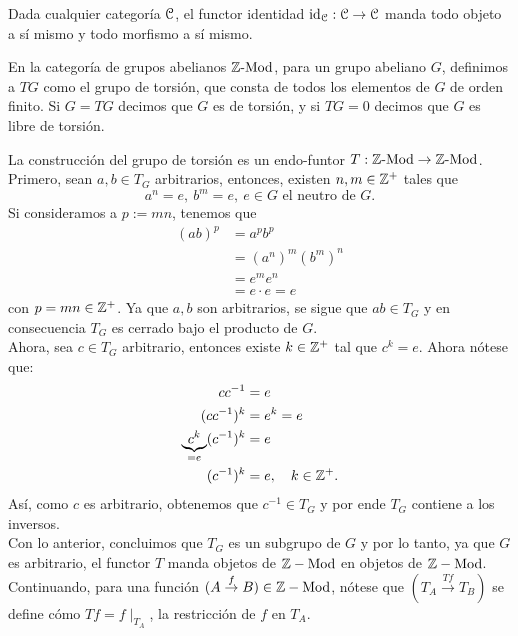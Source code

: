     \begin{example}
    \item Dada cualquier categoría $\cal C$, el functor identidad
        $\id_{\cal C}:\cal C\to\cal C$ manda todo objeto a sí mismo y todo
        morfismo a sí mismo.
    \item En la categoría de grupos abelianos $\Z\ds\Mod$, para
    un grupo abeliano $G$,     definimos a $TG$ como el grupo de
    torsión, que consta de todos los elementos de $G$ de orden
    finito. Si $G=TG$ decimos que $G$ es de torsión, y si $TG=0$
    decimos que $G$ es libre de torsión.
    \end{example}
    
    \begin{example}%
       La construcción del grupo de torsión
        es un endo-funtor $T:\Z\ds\Mod\to\Z\ds\Mod$.
    Primero, sean $a,b\in T_G$ arbitrarios, entonces, existen $n,m\in\Z^+$ tales que
    \begin{equation*}
        a^n=e,\ b^m=e,\ e\in G \text{ el neutro de } G.
    \end{equation*}
    Si consideramos a $p:=mn$, tenemos que 
    \begin{align*}
        (ab)^p & = a^p b^p \\
               & = (a^n)^m (b^m)^n \\
               & = e^m e^n \\
               & = e \cdot e = e
    \end{align*}
    con $p=mn\in\Z^+$. Ya que $a,b$ son arbitrarios, se sigue que $ab\in T_G$ y en consecuencia $T_G$ es cerrado bajo el producto de $G$.\\
    Ahora, sea $c\in T_G$ arbitrario, entonces existe $k\in\Z^+$ tal que $c^k=e$. Ahora nótese que:
    \begin{align*}
        cc^{-1} & = e \\
        (cc^{-1})^k & = e^k = e \\
        \underbrace{c^k}_{=e}(c^{-1})^k & = e \\
        (c^{-1})^k & = e,\quad k\in\Z^+.
    \end{align*}
    Así, como $c$ es arbitrario, obtenemos que $c^{-1}\in T_G$ y por ende $T_G$ contiene a los inversos.\\
    Con lo anterior, concluimos que $T_G$ es un subgrupo de $G$ y por lo tanto, ya que $G$ es arbitrario, el functor $T$ manda objetos de $\Z-\mathrm{Mod}$ en objetos de $\Z-\mathrm{Mod}$.
    Continuando, para una función $(A\overset{f}{\to}B)\in \Z-\mathrm{Mod}$, nótese que $(T_A\overset{Tf}{\to}T_B)$ se define cómo $Tf=f\mid_{T_A}$, la restricción de $f$ en $T_A$.

\end{example}
